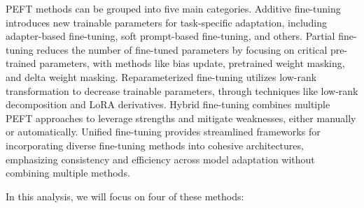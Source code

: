 PEFT methods can be grouped into five main categories. Additive fine-tuning introduces new trainable parameters for task-specific adaptation, including adapter-based fine-tuning, soft prompt-based fine-tuning, and others. Partial fine-tuning reduces the number of fine-tuned parameters by focusing on critical pre-trained parameters, with methods like bias update, pretrained weight masking, and delta weight masking. Reparameterized fine-tuning utilizes low-rank transformation to decrease trainable parameters, through techniques like low-rank decomposition and LoRA derivatives. Hybrid fine-tuning combines multiple PEFT approaches to leverage strengths and mitigate weaknesses, either manually or automatically. Unified fine-tuning provides streamlined frameworks for incorporating diverse fine-tuning methods into cohesive architectures, emphasizing consistency and efficiency across model adaptation without combining multiple methods.

In this analysis, we will focus on four of these methods:



